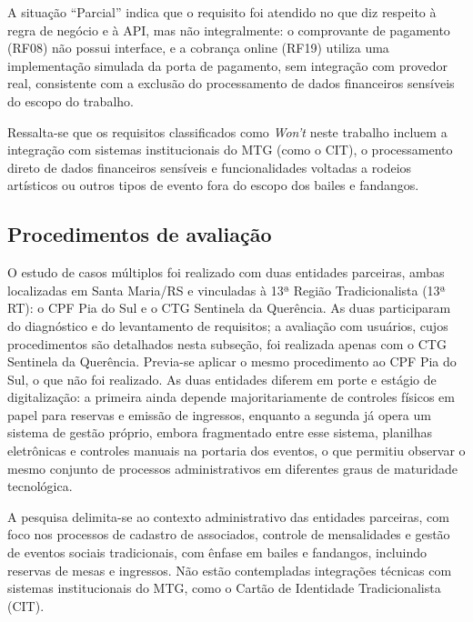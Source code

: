 \documentclass[12pt,a4paper]{article}
\begin{document}
A situação ``Parcial'' indica que o requisito foi atendido no que diz respeito à regra de negócio e à
API, mas não integralmente: o comprovante de pagamento (RF08) não possui interface, e a cobrança online
(RF19) utiliza uma implementação simulada da porta de pagamento, sem integração com provedor real,
consistente com a exclusão do processamento de dados financeiros sensíveis do escopo do trabalho.

Ressalta-se que os requisitos classificados como \textit{Won't} neste trabalho incluem a integração
com sistemas institucionais do MTG (como o CIT), o processamento direto de dados financeiros
sensíveis e funcionalidades voltadas a rodeios artísticos ou outros tipos de evento fora do escopo
dos bailes e fandangos.

\subsection{Procedimentos de avaliação}
\label{sec:avaliacao}
\label{sec:delimitacao}

O estudo de casos múltiplos foi realizado com duas entidades parceiras, ambas localizadas em Santa
Maria/RS e vinculadas à 13ª Região Tradicionalista (13ª RT): o CPF Pia do Sul e o CTG Sentinela da
Querência. As duas participaram do diagnóstico e do levantamento de requisitos; a avaliação com
usuários, cujos procedimentos são detalhados nesta subseção, foi realizada apenas com o CTG Sentinela
da Querência. Previa-se aplicar o mesmo procedimento ao CPF Pia do Sul, o que não foi realizado. As
duas entidades diferem
em porte e estágio de digitalização: a primeira ainda depende majoritariamente de controles físicos
em papel para reservas e emissão de ingressos, enquanto a segunda já opera um sistema de gestão
próprio, embora fragmentado entre esse sistema, planilhas eletrônicas e controles manuais na portaria
dos eventos, o que permitiu observar o mesmo conjunto de processos administrativos em diferentes
graus de maturidade tecnológica.

A pesquisa delimita-se ao contexto administrativo das entidades
parceiras, com foco nos processos de cadastro de associados, controle de mensalidades e gestão de
eventos sociais tradicionais, com ênfase em bailes e fandangos, incluindo reservas de mesas e
ingressos. Não estão contempladas integrações técnicas com sistemas institucionais do MTG, como o
Cartão de Identidade Tradicionalista (CIT).
\end{document}
